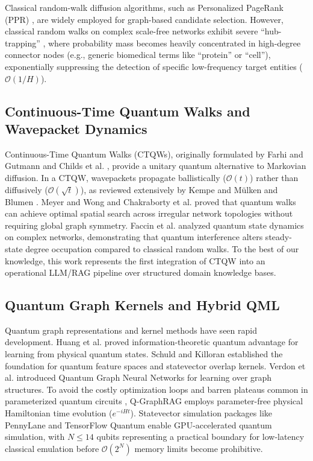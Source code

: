 \documentclass{llncs}
\begin{document}
Classical random-walk diffusion algorithms, such as Personalized PageRank (PPR) \cite{haveliwala2002topic}, are widely employed for graph-based candidate selection. However, classical random walks on complex scale-free networks exhibit severe ``hub-trapping'' \cite{noh2004random,newman2010networks}, where probability mass becomes heavily concentrated in high-degree connector nodes (e.g., generic biomedical terms like ``protein'' or ``cell''), exponentially suppressing the detection of specific low-frequency target entities ($\mathcal{O}(1/H)$).

\subsection{Continuous-Time Quantum Walks and Wavepacket Dynamics}
Continuous-Time Quantum Walks (CTQWs), originally formulated by Farhi and Gutmann \cite{farhi1998quantum} and Childs et al. \cite{childs2002continuous,childs2003exponential}, provide a unitary quantum alternative to Markovian diffusion. In a CTQW, wavepackets propagate ballistically ($\mathcal{O}(t)$) rather than diffusively ($\mathcal{O}(\sqrt{t})$), as reviewed extensively by Kempe \cite{kempe2003quantum} and M{\"u}lken and Blumen \cite{mulken2011continuous}. Meyer and Wong \cite{meyer2015connectivity} and Chakraborty et al. \cite{chakraborty2016spatial} proved that quantum walks can achieve optimal spatial search across irregular network topologies without requiring global graph symmetry. Faccin et al. \cite{faccin2013degree} analyzed quantum state dynamics on complex networks, demonstrating that quantum interference alters steady-state degree occupation compared to classical random walks. To the best of our knowledge, this work represents the first integration of CTQW into an operational LLM/RAG pipeline over structured domain knowledge bases.

\subsection{Quantum Graph Kernels and Hybrid QML}
Quantum graph representations and kernel methods have seen rapid development. Huang et al. \cite{huang2022quantum} proved information-theoretic quantum advantage for learning from physical quantum states. Schuld and Killoran \cite{schuld2019quantum} established the foundation for quantum feature spaces and statevector overlap kernels. Verdon et al. \cite{verdon2019quantum} introduced Quantum Graph Neural Networks for learning over graph structures. To avoid the costly optimization loops and barren plateaus common in parameterized quantum circuits \cite{cerezo2021cost}, Q-GraphRAG employs parameter-free physical Hamiltonian time evolution ($e^{-iHt}$). Statevector simulation packages like PennyLane \cite{bergholm2018pennylane} and TensorFlow Quantum \cite{broughton2020tensorflow} enable GPU-accelerated quantum simulation, with $N \le 14$ qubits representing a practical boundary for low-latency classical emulation before $\mathcal{O}(2^N)$ memory limits become prohibitive.
\end{document}
